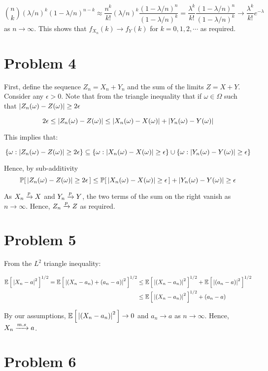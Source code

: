 \documentclass[12pt]{article}%
\begin{document}
\[{n \choose k}\left(\lambda/n\right)^k(1 - \lambda/n)^{n-k} \approx \frac{n^k }{k!}(\lambda/n)^k \frac{(1-\lambda/n)^{n}}{(1-\lambda/n)^{k}}  = \frac{\lambda^k}{k!}\frac{(1-\lambda/n)^{n}}{(1-\lambda/n)^{k}} \rightarrow \frac{\lambda^k}{k!}e^{-\lambda}  \]
as $n \rightarrow \infty$. This shows that $f_{X_n}(k) \rightarrow f_Y(k)$ for $k = 0,1,2, \cdots$ as required.

\section{Problem 4}
First, define the sequence $Z_n = X_n + Y_n$ and the sum of the limits $Z = X + Y$. Consider any $\epsilon >0$. Note that from the triangle inequality that if $\omega \in \Omega$ such that $\abs{Z_n(\omega) - Z(\omega)} \geq 2\epsilon$

\[ 2 \epsilon \leq \abs{Z_n(\omega) - Z(\omega)} \leq \abs{X_n(\omega) - X(\omega)} + \abs{Y_n(\omega) - Y(\omega)} \]

This implies that:

\[ \{\omega : \abs{Z_n(\omega) - Z(\omega)} \geq 2\epsilon\} \subseteq \{\omega :\abs{X_n(\omega) - X(\omega)} \geq \epsilon \} \cup \{\omega :\abs{Y_n(\omega) - Y(\omega)} \geq \epsilon \}  \]

Hence, by sub-additivity
\[ \mathbb{P}[\,\abs{Z_n(\omega) - Z(\omega)} \geq 2\epsilon\,] \leq \mathbb{P}[\,\abs{X_n(\omega) - X(\omega)} \geq \epsilon\,] + \abs{Y_n(\omega) - Y(\omega)} \geq \epsilon \]

As $X_n \xrightarrow[]{p} X$ and $Y_n \xrightarrow[]{p} Y$, the two terms of the sum on the right vanish as $n \rightarrow \infty$. Hence, $Z_n \xrightarrow[]{p} Z$ as required.

\section{Problem 5}
From the $L^2$ triangle inequality:

\begin{align*}
\mathbb{E}\left[\,\abs{X_n - a}^2\,\right]^{1/2} = \mathbb{E}\left[\,\abs{(X_n - a_n) + (a_n - a)}^2\,\right]^{1/2} & \leq \mathbb{E}\left[\,\abs{(X_n - a_n)}^2\,\right]^{1/2} + \mathbb{E}\left[\,\abs{(a_n - a)}^2\,\right]^{1/2} \\
& \leq \mathbb{E}\left[\,\abs{(X_n - a_n)}^2\,\right]^{1/2} + (a_n - a)
\end{align*}

By our assumptions, $\mathbb{E}\left[\,\abs{(X_n - a_n)}^2\,\right] \rightarrow 0$ and $a_n \rightarrow a$ as $n \rightarrow \infty$. Hence, $X_n \xrightarrow[]{m.s} a$.

\section{Problem 6}
\end{document}
